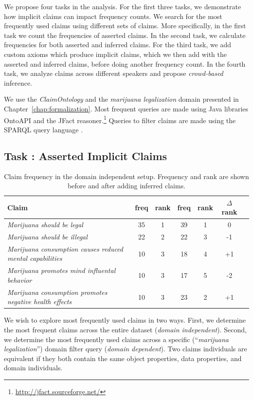 We propose four tasks in the analysis. For the first three tasks, 
we demonstrate how implicit claims can impact frequency counts.
We search for the most frequently used claims using different sets
of claims. More specifically, in the first task we count 
the frequencies of asserted claims. In the second task, we 
calculate frequencies for both asserted and inferred
claims. For the third task, we add custom axioms which produce implicit claims,
which we then add with the asserted and inferred claims, before
doing another frequency count. In the fourth task, we analyze claims
across different speakers and propose \emph{crowd-based} inference.

We use the \emph{ClaimOntology} and the \emph{marijuana legalization} domain
presented in Chapter~\ref{chap:formalization}. Most frequent queries 
are made using Java libraries OntoAPI \citep{bellatreche2007ontoapi} and 
the JFact reasoner.\footnote{\url{http://jfact.sourceforge.net/}}
Queries to filter claims are made using the SPARQL query language
\citep{perez2006semantics}.

\subsection{Task : Asserted Implicit Claims}

\begin{table}[t]
\centering
\begin{tabular}{p{9 cm} | cc | cc | cc}
	\toprule
	\textbf{Claim} & freq & rank & freq & rank & $\Delta$rank \\
\midrule
	\emph{Marijuana should be legal 				}& 35 & 1 & 39 & 1 & 0 \\
	\emph{Marijuana should be illegal 				}& 22 & 2 & 22 & 3 & -1 \\
	\emph{Marijuana consumption causes reduced mental capabilities} & 10 & 3 & 18 & 4 & +1 \\
	\emph{Marijuana promotes mind influental behavior 		}& 10 & 3 & 17 & 5 & -2 \\
	\emph{Marijuana consumption promotes negative health effects 	}& 10 & 3 & 23 & 2 & +1 \\
\bottomrule 
\end{tabular}
\caption{Claim frequency in the domain independent setup. Frequency and rank are
	shown before and after adding inferred claims. }
\label{tab:claim_freq_indep}
\end{table}

We wish to explore most frequently used claims in two ways.
First, we determine the most frequent claims across the entire dataset
(\emph{domain independent}).
Second, we determine the most frequently used claims across a specific 
(``\emph{marijuana legalization}'') domain filter query
(\emph{domain dependent}). 
Two claims individuals are equivalent if they both contain the same
object properties, data properties, and domain individuals. 

